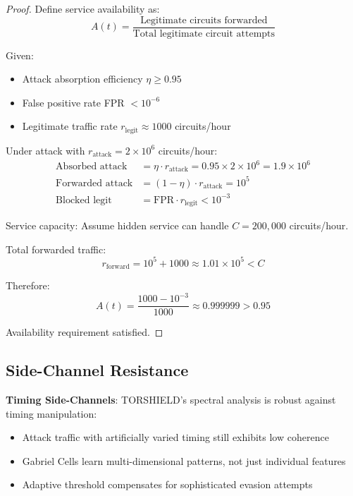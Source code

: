 \documentclass[11pt,a4paper]{article}
\begin{document}
\begin{proof}
Define service availability as:
\begin{equation}
A(t) = \frac{\text{Legitimate circuits forwarded}}{\text{Total legitimate circuit attempts}}
\end{equation}

Given:
\begin{itemize}
\item Attack absorption efficiency $\eta \geq 0.95$
\item False positive rate FPR $< 10^{-6}$
\item Legitimate traffic rate $r_{\text{legit}} \approx 1000$ circuits/hour
\end{itemize}

Under attack with $r_{\text{attack}} = 2 \times 10^6$ circuits/hour:
\begin{align}
\text{Absorbed attack} &= \eta \cdot r_{\text{attack}} = 0.95 \times 2 \times 10^6 = 1.9 \times 10^6 \\
\text{Forwarded attack} &= (1 - \eta) \cdot r_{\text{attack}} = 10^5 \\
\text{Blocked legit} &= \text{FPR} \cdot r_{\text{legit}} < 10^{-3}
\end{align}

Service capacity: Assume hidden service can handle $C = 200{,}000$ circuits/hour.

Total forwarded traffic:
\begin{equation}
r_{\text{forward}} = 10^5 + 1000 \approx 1.01 \times 10^5 < C
\end{equation}

Therefore:
\begin{equation}
A(t) = \frac{1000 - 10^{-3}}{1000} \approx 0.999999 > 0.95
\end{equation}

Availability requirement satisfied.
\end{proof}

\subsection{Side-Channel Resistance}

\textbf{Timing Side-Channels}:
TORSHIELD's spectral analysis is robust against timing manipulation:
\begin{itemize}
\item Attack traffic with artificially varied timing still exhibits low coherence
\item Gabriel Cells learn multi-dimensional patterns, not just individual features
\item Adaptive threshold compensates for sophisticated evasion attempts
\end{itemize}
\end{document}
